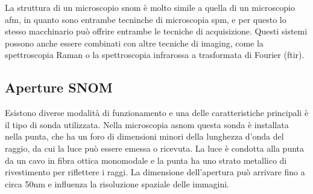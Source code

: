 \documentclass[../main.tex]{subfiles}
\begin{document}
La struttura di un microscopio \acrshort{snom} è molto simile a quella di un microscopio \acrshort{afm}, in quanto sono entrambe tecninche di microscopia \acrshort{spm}, e per questo lo stesso macchinario può offrire entrambe le tecniche di acquisizione. Questi sistemi possono anche essere combinati con altre tecniche di imaging, come la spettroscopia Raman\cite{zhang_2017} o la spettroscopia infrarossa a trasformata di Fourier (\acrshort{ftir}).\cite{rotenberg_2014}

\subsection{Aperture SNOM}

Esistono diverse modalità di funzionamento e una delle caratteristiche principali è il tipo di sonda utilizzata. Nella microscopia \acrshort{asnom} questa sonda è installata nella punta, che ha un foro di dimensioni minori della lunghezza d'onda del raggio, da cui la luce può essere emessa o ricevuta. La luce è condotta alla punta da un cavo in fibra ottica monomodale e la punta ha uno strato metallico di rivestimento per riflettere i raggi. La dimensione dell'apertura può arrivare fino a circa 50nm e influenza la risoluzione spaziale delle immagini.\cite{antosiewicz_2011}
\end{document}

